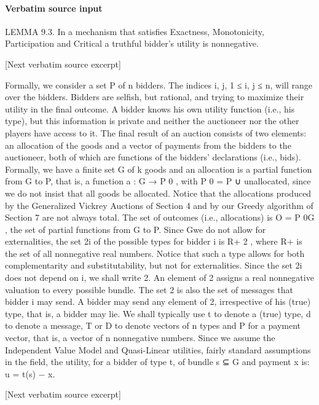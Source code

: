 \documentclass[10pt]{article}
\begin{document}
\paragraph{Verbatim source input}
\begin{ReviewVerbatim}
LEMMA 9.3. In a mechanism that satisfies Exactness, Monotonicity, Participation and Critical a truthful bidder’s utility is nonnegative.

[Next verbatim source excerpt]

Formally, we consider a set P of n bidders. The indices i, j, 1 ≤ i, j ≤ n, will
range over the bidders. Bidders are selfish, but rational, and trying to maximize their
utility in the final outcome. A bidder knows his own utility function (i.e., his type),
but this information is private and neither the auctioneer nor the other players have
access to it. The final result of an auction consists of two elements: an allocation
of the goods and a vector of payments from the bidders to the auctioneer, both of
which are functions of the bidders’ declarations (i.e., bids). Formally, we have a
finite set G of k goods and an allocation is a partial function from G to P, that is, a
function a : G → P 0 , with P 0 = P ∪ {unallocated}, since we do not insist that all
goods be allocated. Notice that the allocations produced by the Generalized Vickrey
Auctions of Section 4 and by our Greedy algorithm of Section 7 are not always
total. The set of outcomes (i.e., allocations) is O = P 0G , the set of partial functions
from G to P. Since Gwe do not allow for externalities, the set 2i of the possible types
for bidder i is R+ 2 , where R+ is the set of all nonnegative real numbers. Notice
that such a type allows for both complementarity and substitutability, but not for
externalities. Since the set 2i does not depend on i, we shall write 2. An element
of 2 assigns a real nonnegative valuation to every possible bundle. The set 2 is
also the set of messages that bidder i may send. A bidder may send any element of
2, irrespective of his (true) type, that is, a bidder may lie. We shall typically use t
to denote a (true) type, d to denote a message, T or D to denote vectors of n types
and P for a payment vector, that is, a vector of n nonnegative numbers.
Since we assume the Independent Value Model and Quasi-Linear utilities, fairly
standard assumptions in the field, the utility, for a bidder of type t, of bundle s ⊆ G
and payment x is:
u = t(s) − x.

[Next verbatim source excerpt]


\end{ReviewVerbatim}
\end{document}

